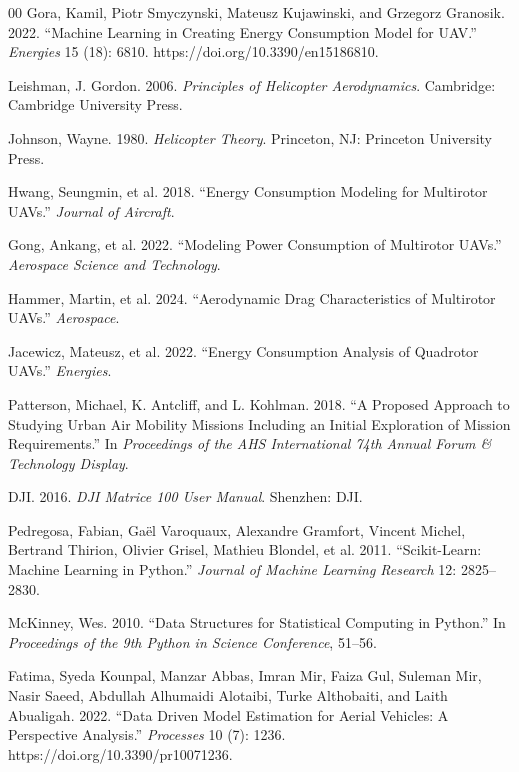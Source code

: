 \documentclass[conference, letter]{IEEEtran}
\begin{document}
\begin{thebibliography}{00}
Gora, Kamil, Piotr Smyczynski, Mateusz Kujawinski, and Grzegorz Granosik. 2022.
“Machine Learning in Creating Energy Consumption Model for UAV.”
\textit{Energies} 15 (18): 6810.
https://doi.org/10.3390/en15186810.

Leishman, J. Gordon. 2006.
\textit{Principles of Helicopter Aerodynamics}.
Cambridge: Cambridge University Press.

Johnson, Wayne. 1980.
\textit{Helicopter Theory}.
Princeton, NJ: Princeton University Press.

Hwang, Seungmin, et al. 2018.
“Energy Consumption Modeling for Multirotor UAVs.”
\textit{Journal of Aircraft}.

Gong, Ankang, et al. 2022.
“Modeling Power Consumption of Multirotor UAVs.”
\textit{Aerospace Science and Technology}.

Hammer, Martin, et al. 2024.
“Aerodynamic Drag Characteristics of Multirotor UAVs.”
\textit{Aerospace}.

Jacewicz, Mateusz, et al. 2022.
“Energy Consumption Analysis of Quadrotor UAVs.”
\textit{Energies}.

Patterson, Michael, K. Antcliff, and L. Kohlman. 2018.
“A Proposed Approach to Studying Urban Air Mobility Missions Including an Initial Exploration of Mission Requirements.”
In \textit{Proceedings of the AHS International 74th Annual Forum \& Technology Display}.

DJI. 2016.
\textit{DJI Matrice 100 User Manual}.
Shenzhen: DJI.

Pedregosa, Fabian, Gaël Varoquaux, Alexandre Gramfort, Vincent Michel, Bertrand Thirion, Olivier Grisel, Mathieu Blondel, et al. 2011.
“Scikit-Learn: Machine Learning in Python.”
\textit{Journal of Machine Learning Research} 12: 2825–2830.

McKinney, Wes. 2010.
“Data Structures for Statistical Computing in Python.”
In \textit{Proceedings of the 9th Python in Science Conference}, 51–56.

Fatima, Syeda Kounpal, Manzar Abbas, Imran Mir, Faiza Gul, Suleman Mir, Nasir Saeed, Abdullah Alhumaidi Alotaibi, Turke Althobaiti, and Laith Abualigah. 2022.
“Data Driven Model Estimation for Aerial Vehicles: A Perspective Analysis.”
\textit{Processes} 10 (7): 1236.
https://doi.org/10.3390/pr10071236.


\end{thebibliography}
\vspace{12pt}
\end{document}
